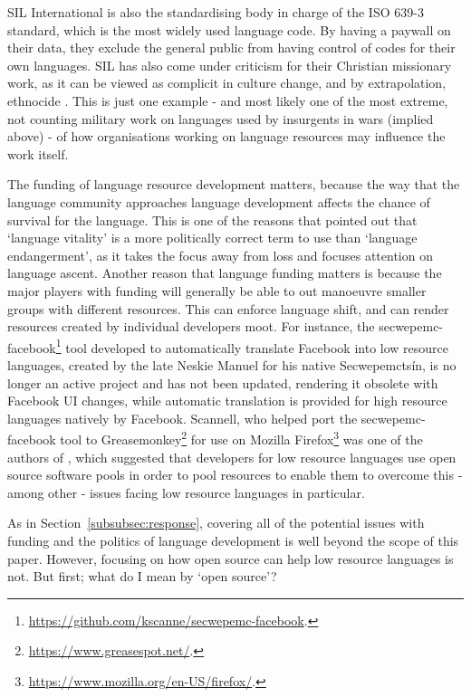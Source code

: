 SIL International is also the standardising body in charge of the ISO 639-3 standard, which is the most widely used language code. By having a paywall on their data, they exclude the general public from having control of codes for their own languages. SIL has also come under criticism for their Christian missionary work, as it can be viewed as complicit in culture change, and by extrapolation, ethnocide \citep{dobrin2009sil, dobrin2009practical, everett2009don}. This is just one example - and most likely one of the most extreme, not counting military work on languages used by insurgents in wars (implied above) - of how organisations working on language resources may influence the work itself.

The funding of language resource development matters, because the way that the language community approaches language development affects the chance of survival for the language. This is one of the reasons that \citet{grenoble2016response} pointed out that `language vitality' is a more politically correct term to use than `language endangerment', as it takes the focus away from loss and focuses attention on language ascent. Another reason that language funding matters is because the major players with funding will generally be able to out manoeuvre smaller groups with different resources. This can enforce language shift, and can render resources created by individual developers moot. For instance, the secwepemc-facebook\footnote{\href{https://github.com/kscanne/secwepemc-facebook}{https://github.com/kscanne/secwepemc-facebook}. } tool developed to automatically translate Facebook into low resource languages, created by the late Neskie Manuel for his native Secwepemcts\'in, is no longer an active project and has not been updated, rendering it obsolete with Facebook UI changes, while automatic translation is provided for high resource languages natively by Facebook. Scannell, who helped port the secwepemc-facebook tool to Greasemonkey\footnote{\href{https://www.greasespot.net/}{https://www.greasespot.net/}. } for use on Mozilla Firefox\footnote{\href{https://www.mozilla.org/en-US/firefox/}{https://www.mozilla.org/en-US/firefox/}. } was one of the authors of \citet{streiter2006implementing}, which suggested that developers for low resource languages use open source software pools in order to pool resources to enable them to overcome this - among other - issues facing low resource languages in particular.

As in Section~\ref{subsubsec:response}, covering all of the potential issues with funding and the politics of language development is well beyond the scope of this paper. However, focusing on how open source can help low resource languages is not. But first; what do I mean by `open source'?
